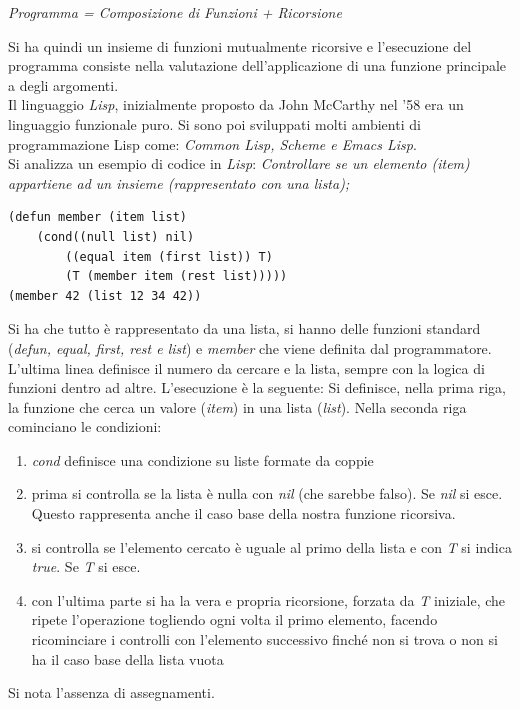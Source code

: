 \documentclass[a4paper,12pt, oneside]{book}
\begin{document}
\begin{enumerate}
\begin{center}
\textit{Programma = Composizione di Funzioni + Ricorsione}
\end{center}
Si ha quindi un insieme di funzioni mutualmente ricorsive e l'esecuzione del programma consiste nella valutazione dell'applicazione di una funzione principale a degli argomenti.\\
Il linguaggio \textit{Lisp}, inizialmente proposto da John McCarthy nel '58 era un linguaggio funzionale puro. Si sono poi sviluppati molti ambienti di programmazione Lisp come: \textit{Common Lisp, Scheme e Emacs Lisp}.\\
Si analizza un esempio di codice in \textit{Lisp}:
\textit{Controllare se un elemento (item) appartiene ad un insieme (rappresentato con una lista);}
\begin{verbatim}
(defun member (item list)
	(cond((null list) nil)
		((equal item (first list)) T)
		(T (member item (rest list)))))
(member 42 (list 12 34 42))
\end{verbatim}
Si ha che tutto è rappresentato da una lista, si hanno delle funzioni standard (\textit{defun, equal, first, rest e list}) e \textit{member} che viene definita dal programmatore. L'ultima linea definisce il numero da cercare e la lista, sempre con la logica di funzioni dentro ad altre. L'esecuzione è la seguente: Si definisce, nella prima riga, la funzione che cerca un valore (\textit{item}) in una lista (\textit{list}). Nella seconda riga cominciano le condizioni: 
\begin{enumerate}
\item \textit{cond} definisce una condizione su liste formate da coppie
\item prima si controlla se la lista è nulla con \textit{nil} (che sarebbe falso). Se \textit{nil} si esce. Questo rappresenta anche il caso base della nostra funzione ricorsiva.
\item si controlla se l'elemento cercato è uguale al primo della lista e con \textit{T} si indica \textit{true}. Se \textit{T} si esce.
\item con l'ultima parte si ha la vera e propria ricorsione, forzata da \textit{T} iniziale, che ripete l'operazione togliendo ogni volta il primo elemento, facendo ricominciare i controlli con l'elemento successivo finché non si trova o non si ha il caso base della lista vuota
\end{enumerate}
Si nota l'assenza di assegnamenti.
\end{enumerate}
\end{document}
